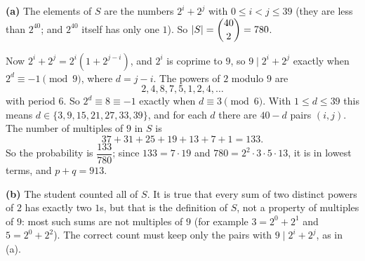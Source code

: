 \textbf{(a)} The elements of $S$ are the numbers $2^i+2^j$ with $0\le i<j\le39$ (they are less than $2^{40}$; and $2^{40}$ itself has only one $1$). So $|S|=\dbinom{40}{2}=780$.

Now $2^i+2^j=2^i\left(1+2^{j-i}\right)$, and $2^i$ is coprime to $9$, so $9\mid2^i+2^j$ exactly when $2^{d}\equiv-1\pmod9$, where $d=j-i$. The powers of $2$ modulo $9$ are
\[2,4,8,7,5,1,2,4,\dots\]
with period $6$. So $2^d\equiv8\equiv-1$ exactly when $d\equiv3\pmod6$. With $1\le d\le39$ this means $d\in\{3,9,15,21,27,33,39\}$, and for each $d$ there are $40-d$ pairs $(i,j)$. The number of multiples of $9$ in $S$ is
\[37+31+25+19+13+7+1=133.\]
So the probability is $\dfrac{133}{780}$; since $133=7\cdot19$ and $780=2^2\cdot3\cdot5\cdot13$, it is in lowest terms, and $p+q=\boxed{913}$.

\textbf{(b)} The student counted all of $S$. It is true that every sum of two distinct powers of $2$ has exactly two $1$s, but that is the definition of $S$, not a property of multiples of $9$: most such sums are not multiples of $9$ (for example $3=2^0+2^1$ and $5=2^0+2^2$). The correct count must keep only the pairs with $9\mid2^i+2^j$, as in (a).
